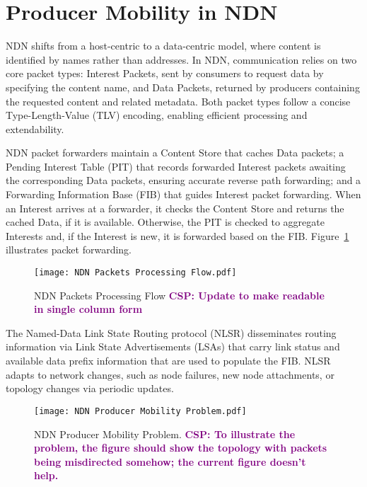 \documentclass[10pt,conference]{IEEEtran}
\newcommand{\csp}[1]{\textbf{\textcolor{purple}{CSP: #1}}}
\begin{document}
\section{Producer Mobility in NDN}
\label{sec:problem}

NDN shifts from a host-centric to a data-centric model, where content is identified by names rather than addresses. In NDN, communication relies on two core packet types: Interest Packets, sent by consumers to request data by specifying the content name, and Data Packets, returned by producers containing the requested content and related metadata. Both packet types follow a concise Type-Length-Value (TLV) encoding, enabling efficient processing and extendability.

NDN packet forwarders maintain a Content Store that caches Data packets; a Pending Interest Table (PIT) that records forwarded Interest packets awaiting the corresponding Data packets, ensuring accurate reverse path forwarding; and a Forwarding Information Base (FIB) that guides Interest packet forwarding.
When an Interest arrives at a forwarder, it checks the Content Store and returns the cached Data, if it is available. Otherwise, the PIT is checked to aggregate Interests and, if the Interest is new, it is forwarded based on the FIB. Figure~\ref{fig:NDN Packets Processing Flow} illustrates packet forwarding.

\begin{figure}[t]
    \centering
    \texttt{[image: NDN Packets Processing Flow.pdf]}
    \caption{NDN Packets Processing Flow \csp{Update to make readable in single column form}}
    \label{fig:NDN Packets Processing Flow}
\end{figure}

The Named-Data Link State Routing protocol (NLSR) disseminates routing information via Link State Advertisements (LSAs) that carry link status and available data prefix information that are used to populate the FIB. NLSR adapts to network changes, such as node failures, new node attachments, or topology changes via periodic updates.

\begin{figure}[t]
    \centering
    \texttt{[image: NDN Producer Mobility Problem.pdf]}
    \caption{NDN Producer Mobility Problem. \csp{To illustrate the problem, the figure should show the topology with packets being misdirected somehow; the current figure doesn't help.}}
    \label{fig:NDN Producer Mobility Problem}
\end{figure}
\end{document}
